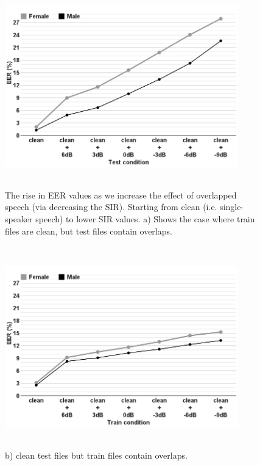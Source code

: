 \begin{figure}[t!]
	\centering
	\includegraphics[height = 3.43in, width=0.9\textwidth]{figures/sidingrid_ovlintest}
	\vspace{-1mm}
	\caption{The rise in EER values as we increase the effect of overlapped speech (via decreasing the SIR). Starting from clean (i.e. single-speaker speech) to lower SIR values. a) Shows the case where train files are clean, but test files contain overlaps. }
	\label{fig:sidingrid_ovlintest_train_a}
\end{figure}
\begin{figure}[t]%
	\centering
	\includegraphics[height = 3.43in, width=0.9\textwidth]{figures/sidingrid_ovlintrain}
	\vspace{-1mm}
	\caption{b) clean test files but train files contain overlaps.}
	\label{fig:sidingrid_ovlintest_train_b}
\end{figure}




